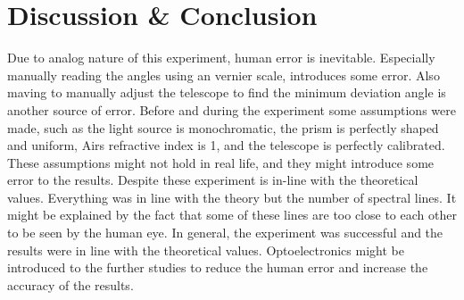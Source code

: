 \documentclass[10pt]{article}
\begin{document}
\FloatBarrier

\section{Discussion \& Conclusion}

Due to analog nature of this experiment, human error is inevitable. Especially manually reading the angles using an vernier scale, introduces some error.
Also maving to manually adjust the telescope to find the minimum deviation angle is another source of error.
Before and during the experiment some assumptions were made, such as the light source is monochromatic, the prism is perfectly shaped and uniform, Airs refractive index is 1, and the telescope is perfectly calibrated. These assumptions might not hold in real life, and they might introduce some error to the results.
Despite these experiment is in-line with the theoretical values. Everything was in line with the theory but the number of spectral lines. It might be explained by the fact that some of these lines are too close to each other to be seen by the human eye.
In general, the experiment was successful and the results were in line with the theoretical values. Optoelectronics might be introduced to the further studies to reduce the human error and increase the accuracy of the results. 

\printbibliography
\end{document}
